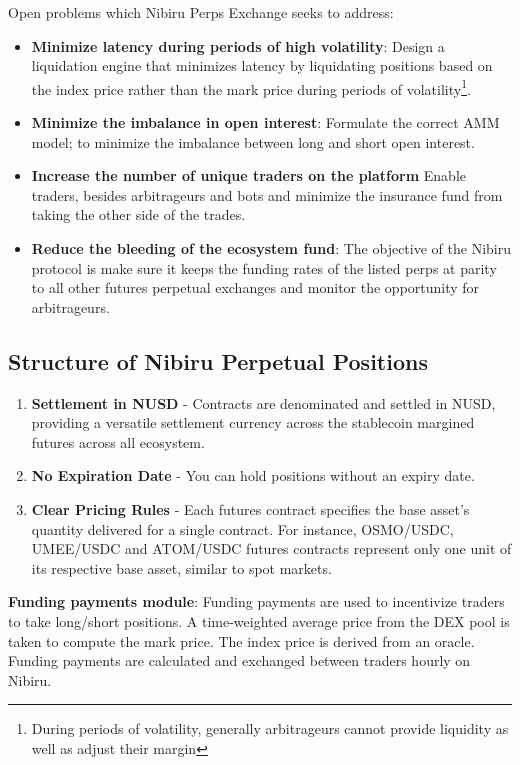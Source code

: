 \documentclass[11pt]{article}
\begin{document}
Open problems which Nibiru Perps Exchange seeks to address:
\begin{itemize}
\item \textbf{Minimize latency during periods of high volatility}: Design a liquidation engine that minimizes latency by liquidating positions based on the index price rather than the mark price during periods of volatility\footnote{During periods of volatility, generally arbitrageurs cannot provide liquidity as well as adjust their margin}. 
\item \textbf{Minimize the imbalance in open interest}: Formulate the correct AMM model; to minimize the imbalance between long and short open interest.
\item \textbf{Increase the number of unique traders on the platform} Enable traders, besides arbitrageurs and bots and minimize the insurance fund from taking the other side of the trades.
\item \textbf{Reduce the bleeding of the ecosystem fund}: The objective of the
  Nibiru protocol is make sure it keeps the funding rates of the listed perps at parity to all other futures perpetual exchanges and monitor the opportunity for arbitrageurs. 
\end{itemize}


\subsection*{Structure of Nibiru Perpetual Positions}

\begin{enumerate}
\item \textbf{Settlement in NUSD} - Contracts are denominated and settled in NUSD, providing a versatile settlement currency across the stablecoin margined futures across all ecosystem.
\item \textbf{No Expiration Date} - You can hold positions without an expiry date. 
\item \textbf{Clear Pricing Rules} - Each futures contract specifies the base asset's quantity delivered for a single contract. For instance, OSMO/USDC, UMEE/USDC and ATOM/USDC futures contracts represent only one unit of its respective base asset, similar to spot markets. 
\end{enumerate}

\textbf{Funding payments module}: Funding payments are used to incentivize traders to take long/short positions. A time-weighted average price from the DEX pool is taken to compute the mark price. The index price is derived from an oracle. Funding payments are calculated and exchanged between traders hourly on Nibiru.
\end{document}
